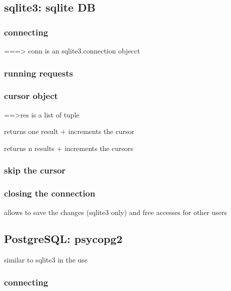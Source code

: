 	\subsection{sqlite3: sqlite DB}

	\subsubsection{connecting}


		 ===> conn is an sqlite3.connection objecct

	\subsubsection{running requests}

		\subsubsection{cursor object}


			 ==>res is a list of tuple

			 returns one result + increments the cursor

			 returns n results + increments the cursors

	\subsubsection{skip the cursor}

	\subsubsection{closing the connection}

		allows to save the changes (sqlite3 only) and free accesses for other users


		\subsection{PostgreSQL: psycopg2}
			similar to sqlite3 in the use

		\subsubsection{connecting}
			
